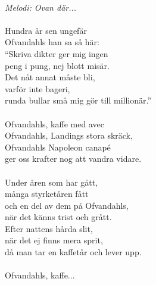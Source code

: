 \\
{\footnotesize\textit{Melodi: Ovan där...}}\\
\\
Hundra år sen ungefär\\
Ofvandahls han sa så här:\\
``Skriva dikter ger mig ingen\\
peng i pung, nej blott misär.\\
Det nåt annat måste bli,\\
varför inte bageri,\\
runda bullar små mig gör till millionär.''\\
\\
Ofvandahls, kaffe med avec\\
Ofvandahls, Landings stora skräck,\\
Ofvandahls Napoleon canapé\\
ger oss krafter nog att vandra vidare.\\
\\
Under åren som har gått,\\
många styrketåren fått\\
och en del av dem på Ofvandahls,\\
när det känns trist och grått.\\
Efter nattens hårda slit, \\
när det ej finns mera sprit,\\
då man tar en kaffetår och lever upp.\\
\\
Ofvandahls, kaffe...
